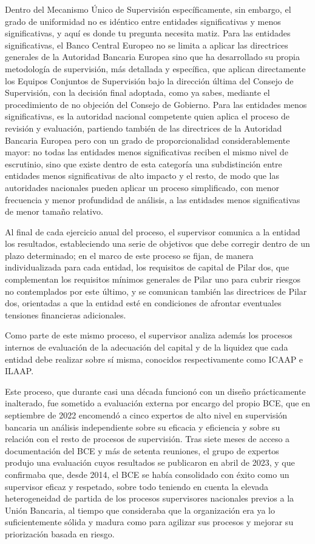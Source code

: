 \documentclass[10pt,a4paper]{article}
\begin{document}
{{Dentro del Mecanismo Único de Supervisión específicamente, sin embargo, el grado de uniformidad no es idéntico entre entidades significativas y menos significativas, y aquí es donde tu pregunta necesita matiz. Para las entidades significativas, el Banco Central Europeo no se limita a aplicar las directrices generales de la Autoridad Bancaria Europea sino que ha desarrollado su propia metodología de supervisión, más detallada y específica, que aplican directamente los Equipos Conjuntos de Supervisión bajo la dirección última del Consejo de Supervisión, con la decisión final adoptada, como ya sabes, mediante el procedimiento de no objeción del Consejo de Gobierno. Para las entidades menos significativas, es la autoridad nacional competente quien aplica el proceso de revisión y evaluación, partiendo también de las directrices de la Autoridad Bancaria Europea pero con un grado de proporcionalidad considerablemente mayor: no todas las entidades menos significativas reciben el mismo nivel de escrutinio, sino que existe dentro de esta categoría una subdistinción entre entidades menos significativas de alto impacto y el resto, de modo que las autoridades nacionales pueden aplicar un proceso simplificado, con menor frecuencia y menor profundidad de análisis, a las entidades menos significativas de menor tamaño relativo.
}

Al final de cada ejercicio anual del proceso, el supervisor comunica a la entidad los resultados, estableciendo una serie de objetivos que debe corregir dentro de un plazo determinado; en el marco de este proceso se fijan, de manera individualizada para cada entidad, los requisitos de capital de Pilar dos, que complementan los requisitos mínimos generales de Pilar uno para cubrir riesgos no contemplados por este último, y se comunican también las directrices de Pilar dos, orientadas a que la entidad esté en condiciones de afrontar eventuales tensiones financieras adicionales. 

Como parte de este mismo proceso, el supervisor analiza además los procesos internos de evaluación de la adecuación del capital y de la liquidez que cada entidad debe realizar sobre sí misma, conocidos respectivamente como ICAAP e ILAAP.

Este proceso, que durante casi una década funcionó con un diseño prácticamente inalterado, fue sometido a evaluación externa por encargo del propio BCE, que en septiembre de 2022 encomendó a cinco expertos de alto nivel en supervisión bancaria un análisis independiente sobre su eficacia y eficiencia y sobre su relación con el resto de procesos de supervisión. Tras siete meses de acceso a documentación del BCE y más de setenta reuniones, el grupo de expertos produjo una evaluación cuyos resultados se publicaron en abril de 2023, y que confirmaba que, desde 2014, el BCE se había consolidado con éxito como un supervisor eficaz y respetado, sobre todo teniendo en cuenta la elevada heterogeneidad de partida de los procesos supervisores nacionales previos a la Unión Bancaria, al tiempo que consideraba que la organización era ya lo suficientemente sólida y madura como para agilizar sus procesos y mejorar su priorización basada en riesgo. 

}
\end{document}
